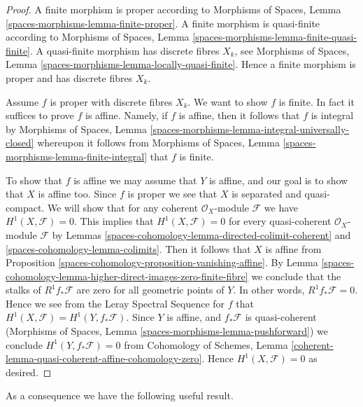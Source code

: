 \begin{proof}
A finite morphism is proper according to
Morphisms of Spaces, Lemma \ref{spaces-morphisms-lemma-finite-proper}.
A finite morphism is quasi-finite according to
Morphisms of Spaces, Lemma \ref{spaces-morphisms-lemma-finite-quasi-finite}.
A quasi-finite morphism has discrete fibres $X_k$, see
Morphisms of Spaces, Lemma \ref{spaces-morphisms-lemma-locally-quasi-finite}.
Hence a finite morphism is proper and has discrete fibres $X_k$.

\medskip\noindent
Assume $f$ is proper with discrete fibres $X_k$.
We want to show $f$ is finite.
In fact it suffices to prove $f$ is affine.
Namely, if $f$ is affine, then it follows that
$f$ is integral by
Morphisms of Spaces, Lemma
\ref{spaces-morphisms-lemma-integral-universally-closed}
whereupon it follows from
Morphisms of Spaces, Lemma \ref{spaces-morphisms-lemma-finite-integral}
that $f$ is finite.

\medskip\noindent
To show that $f$ is affine we may assume that $Y$ is affine, and our
goal is to show that $X$ is affine too.
Since $f$ is proper we see that $X$ is separated and quasi-compact.
We will show that for any coherent
$\mathcal{O}_X$-module $\mathcal{F}$ we have $H^1(X, \mathcal{F}) = 0$.
This implies that $H^1(X, \mathcal{F}) = 0$ for every quasi-coherent
$\mathcal{O}_X$-module $\mathcal{F}$ by
Lemmas \ref{spaces-cohomology-lemma-directed-colimit-coherent} and \ref{spaces-cohomology-lemma-colimits}.
Then it follows that $X$ is affine from
Proposition \ref{spaces-cohomology-proposition-vanishing-affine}. By
Lemma \ref{spaces-cohomology-lemma-higher-direct-images-zero-finite-fibre}
we conclude that the stalks of $R^1f_*\mathcal{F}$
are zero for all geometric points of $Y$.
In other words, $R^1f_*\mathcal{F} = 0$. Hence we see from
the Leray Spectral Sequence for $f$ that
$H^1(X , \mathcal{F}) = H^1(Y, f_*\mathcal{F})$.
Since $Y$ is affine, and $f_*\mathcal{F}$ is quasi-coherent
(Morphisms of Spaces, Lemma \ref{spaces-morphisms-lemma-pushforward})
we conclude $H^1(Y, f_*\mathcal{F}) = 0$
from
Cohomology of Schemes, Lemma
\ref{coherent-lemma-quasi-coherent-affine-cohomology-zero}.
Hence $H^1(X, \mathcal{F}) = 0$ as desired.
\end{proof}

As a consequence we have the following useful result.

